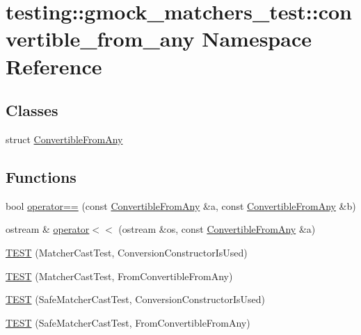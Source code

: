\hypertarget{namespacetesting_1_1gmock__matchers__test_1_1convertible__from__any}{}\section{testing\+::gmock\+\_\+matchers\+\_\+test\+::convertible\+\_\+from\+\_\+any Namespace Reference}
\label{namespacetesting_1_1gmock__matchers__test_1_1convertible__from__any}
\subsection*{Classes}
\begin{DoxyCompactItemize}
\item 
struct \mbox{\hyperlink{structtesting_1_1gmock__matchers__test_1_1convertible__from__any_1_1ConvertibleFromAny}{Convertible\+From\+Any}}
\end{DoxyCompactItemize}
\subsection*{Functions}
\begin{DoxyCompactItemize}
\item 
bool \mbox{\hyperlink{namespacetesting_1_1gmock__matchers__test_1_1convertible__from__any_a11d27383932d6907ea215955a8dacc3b}{operator==}} (const \mbox{\hyperlink{structtesting_1_1gmock__matchers__test_1_1convertible__from__any_1_1ConvertibleFromAny}{Convertible\+From\+Any}} \&a, const \mbox{\hyperlink{structtesting_1_1gmock__matchers__test_1_1convertible__from__any_1_1ConvertibleFromAny}{Convertible\+From\+Any}} \&b)
\item 
ostream \& \mbox{\hyperlink{namespacetesting_1_1gmock__matchers__test_1_1convertible__from__any_a8bc42601c60dc9c5e42861c922d63e64}{operator$<$$<$}} (ostream \&os, const \mbox{\hyperlink{structtesting_1_1gmock__matchers__test_1_1convertible__from__any_1_1ConvertibleFromAny}{Convertible\+From\+Any}} \&a)
\item 
\mbox{\hyperlink{namespacetesting_1_1gmock__matchers__test_1_1convertible__from__any_af5ebdc7f68d7e1e48c6dacfaffd6f58a}{T\+E\+ST}} (Matcher\+Cast\+Test, Conversion\+Constructor\+Is\+Used)
\item 
\mbox{\hyperlink{namespacetesting_1_1gmock__matchers__test_1_1convertible__from__any_a72a4c336022bdea69ce15ba085f0e58e}{T\+E\+ST}} (Matcher\+Cast\+Test, From\+Convertible\+From\+Any)
\item 
\mbox{\hyperlink{namespacetesting_1_1gmock__matchers__test_1_1convertible__from__any_aca99c4625c546ea8390dcd2244626a43}{T\+E\+ST}} (Safe\+Matcher\+Cast\+Test, Conversion\+Constructor\+Is\+Used)
\item 
\mbox{\hyperlink{namespacetesting_1_1gmock__matchers__test_1_1convertible__from__any_a97a2ef4bbe1a2702e4bf79c12b1b9e9a}{T\+E\+ST}} (Safe\+Matcher\+Cast\+Test, From\+Convertible\+From\+Any)
\end{DoxyCompactItemize}


